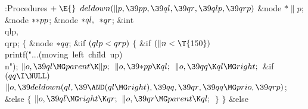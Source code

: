 \B{}:Procedures\X${}\mathrel+\E{}$\6
$\\{deldown}(\|p,\39\\{pp},\39\\{ql},\39\\{qr},\39\\{qlp},\39\\{qrp}){}$\1\1\6
\&{node} ${}{*}\|p{}$;\6
\&{node} ${}{*}{*}\\{pp}{}$;\6
\&{node} ${}{*}\\{ql},{}$ ${}{*}\\{qr}{}$;\6
\&{int} \\{qlp}${},{}$ \\{qrp};\2\2\6
${}\{{}$\5
\1\&{node} ${}{*}\\{qq}{}$;\7
\&{if} ${}(\\{qlp}<\\{qrp}){}$\5
${}\{{}$\1\6
\&{if} ${}(\|n<\T{150}){}$\1\5
\\{printf}(\.{"...(moving\ left\ chi}\)\.{ld\ up)\\n"});\2\6
${}\|o,\39\\{ql}\MG\\{parent}\K\|p;{}$\6
${}\|o,\39{*}\\{pp}\K\\{ql};{}$\6
${}\|o,\39\\{qq}\K\\{ql}\MG\\{right};{}$\6
\&{if} ${}(\\{qq}\I\NULL){}$\1\5
${}\|o,\39\\{deldown}(\\{ql},\39{\AND}(\\{ql}\MG\\{right}),\39\\{qq},\39\\{qr},%
\39\\{qq}\MG\\{prio},\39\\{qrp}){}$;\2\6
\&{else}\5
${}\{{}$\1\6
${}\|o,\39\\{ql}\MG\\{right}\K\\{qr};{}$\6
${}\|o,\39\\{qr}\MG\\{parent}\K\\{ql};{}$\6
\4${}\}{}$\2\6
\4${}\}{}$\2\6
\&{else}\5

